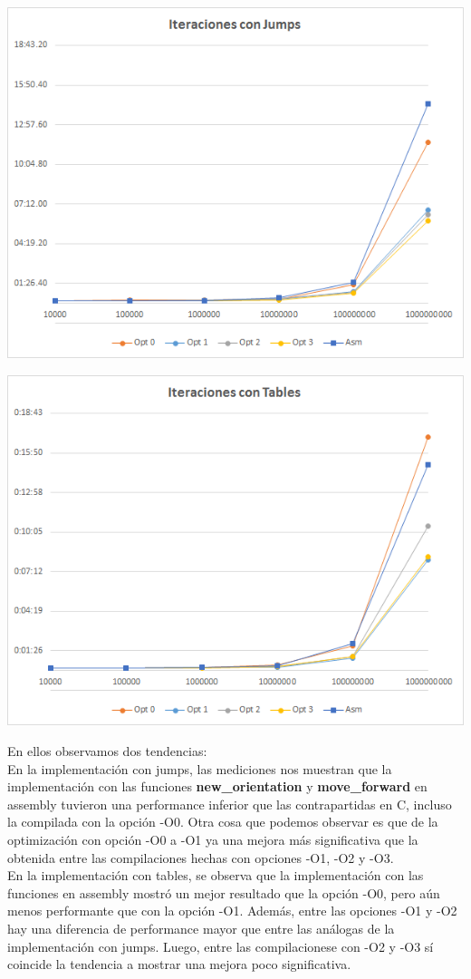 \documentclass[a4paper, 10pt, twoside, notitlepage]{article}
\begin{document}
\includegraphics[scale=0.9]{chart1.png} 

\includegraphics[scale=0.9]{chart2.png} 

\newpage
En ellos observamos dos tendencias:\\
En la implementación con jumps, las mediciones nos muestran que la implementación con las funciones \textbf{new\_orientation} y \textbf{move\_forward} en assembly tuvieron una performance inferior que las contrapartidas en C, incluso la compilada con la opción -O0.
Otra cosa que podemos observar es que de la optimización con opción -O0 a -O1 ya una mejora más significativa que la obtenida entre las compilaciones hechas con opciones -O1, -O2 y -O3.\\
En la implementación con tables, se observa que la implementación con las funciones en assembly mostró un mejor resultado que la opción -O0, pero aún menos performante que con la opción -O1. Además, entre las opciones -O1 y -O2 hay una diferencia de performance mayor que entre las análogas de la implementación con jumps. Luego, entre las compilacionese con -O2 y -O3 sí coincide la tendencia a mostrar una mejora poco significativa.\\
\end{document}
